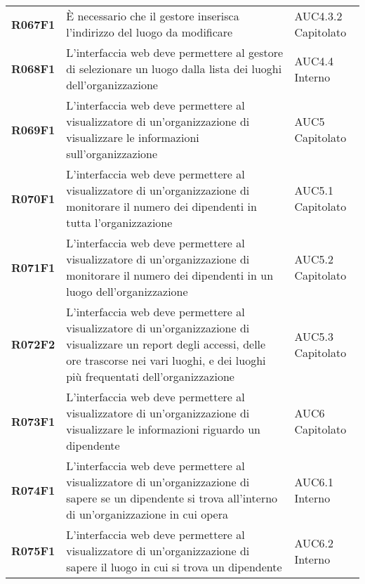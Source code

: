 \documentclass[../analisi-dei-requisiti.tex]{subfiles}
\begin{document}
\begin{longtable}[H]{>{\centering\bfseries}m{3cm} >{\centering}m{10cm} >{\centering\arraybackslash}m{3cm}}
  R067F1                               & È necessario che il gestore inserisca l'indirizzo del luogo da modificare                                                                                                                               & AUC4.3.2 Capitolato           \\
  R068F1                               & L'interfaccia web deve permettere al gestore di selezionare un luogo dalla lista dei luoghi dell'organizzazione                                                                                         & AUC4.4 Interno                \\
  R069F1                               & L'interfaccia web deve permettere al visualizzatore di un'organizzazione di visualizzare le informazioni sull'organizzazione                                                                            & AUC5 Capitolato               \\
  R070F1                               & L'interfaccia web deve permettere al visualizzatore di un'organizzazione di monitorare il numero dei dipendenti in tutta l'organizzazione                                                               & AUC5.1 Capitolato             \\
  R071F1                               & L'interfaccia web deve permettere al visualizzatore di un'organizzazione di monitorare il numero dei dipendenti in un luogo dell'organizzazione                                                         & AUC5.2 Capitolato             \\
  R072F2                               & L'interfaccia web deve permettere al visualizzatore di un'organizzazione di visualizzare un report degli accessi, delle ore trascorse nei vari luoghi, e dei luoghi più frequentati dell'organizzazione & AUC5.3 Capitolato             \\
  R073F1                               & L'interfaccia web deve permettere al visualizzatore di un'organizzazione di visualizzare le informazioni riguardo un dipendente                                                                         & AUC6 Capitolato               \\
  R074F1                               & L'interfaccia web deve permettere al visualizzatore di un'organizzazione di sapere se un dipendente si trova all'interno di un'organizzazione in cui opera                                              & AUC6.1 Interno                \\
  R075F1                               & L'interfaccia web deve permettere al visualizzatore di un'organizzazione di sapere il luogo in cui si trova un dipendente                                                                               & AUC6.2 Interno                \\


\end{longtable}
\end{document}
